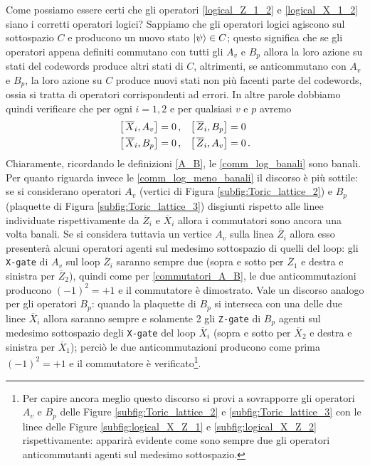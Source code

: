 \noindent Come possiamo essere certi che gli operatori \eqref{logical_Z_1_2} e \eqref{logical_X_1_2} siano i corretti operatori logici? Sappiamo che gli operatori logici agiscono sul sottospazio $C$ e producono un nuovo stato $\ket{\psi} \in C$; questo significa che se gli operatori appena definiti commutano con tutti gli $A_v$ e $B_p$ allora la loro azione su stati del codewords produce altri stati di $C$, altrimenti, se anticommutano con $A_v$ e $B_p$, la loro azione su $C$ produce nuovi stati non più facenti parte del codewords, ossia si tratta di operatori corrispondenti ad errori. In altre parole dobbiamo quindi verificare che per ogni $i = 1 ,2$ e per qualsiasi $v$ e $p$ avremo
\begin{align}
    \comm{ \,\overline{X}_i}{ A_v} &= 0 \, , &\comm{ \,\overline{Z}_i}{ B_p} &= 0 \label{comm_log_banali} \\
    \comm{ \,\overline{X}_i}{ B_p} &= 0 \, , &\comm{ \,\overline{Z}_i}{ A_v} &= 0 \, . \label{comm_log_meno_banali}
\end{align}
Chiaramente, ricordando le definizioni \eqref{A_B}, le \eqref{comm_log_banali} sono banali. Per quanto riguarda invece le \eqref{comm_log_meno_banali} il discorso è più sottile: se si considerano operatori $A_v$ (vertici di Figura \ref{subfig:Toric_lattice_2}) e $B_p$ (plaquette di Figura \ref{subfig:Toric_lattice_3}) disgiunti rispetto alle linee individuate rispettivamente da $\overline{Z}_i$ e $\overline{X}_i$ allora i commutatori sono ancora una volta banali. Se si considera tuttavia un vertice $A_v$ sulla linea $\overline{Z}_i$ allora esso presenterà alcuni operatori agenti sul medesimo sottospazio di quelli del loop: gli \texttt{X-gate} di $A_v$ sul loop $\overline{Z}_i$ saranno sempre due (sopra e sotto per $\overline{Z}_1$ e destra e sinistra per $\overline{Z}_2$), quindi come per \eqref{commutatori_A_B}, le due anticommutazioni producono $(-1)^2 = +1$ e il commutatore è dimostrato. Vale un discorso analogo per gli operatori $B_p$: quando la plaquette di $B_p$ si interseca con una delle due linee $\overline{X}_i$ allora saranno sempre e solamente 2 gli \texttt{Z-gate} di $B_p$ agenti sul medesimo sottospazio degli \texttt{X-gate} del loop $\overline{X}_i$ (sopra e sotto per $\overline{X}_2$ e destra e sinistra per $\overline{X}_1$); perciò le due anticommutazioni producono come prima $(-1)^2 = +1$ e il commutatore è verificato\footnote{Per capire ancora meglio questo discorso si provi a sovrapporre gli operatori $A_v$ e $B_p$ delle Figure \ref{subfig:Toric_lattice_2} e \ref{subfig:Toric_lattice_3} con le linee delle Figure \ref{subfig:logical_X_Z_1} e \ref{subfig:logical_X_Z_2} rispettivamente: apparirà evidente come sono sempre due gli operatori anticommutanti agenti sul medesimo sottospazio.}.

